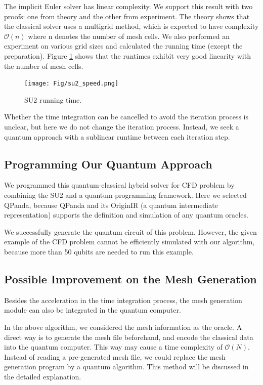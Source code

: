 \documentclass[%
 reprint,
 amsmath,amssymb,
pra,
]{revtex4-1}
\begin{document}
The implicit Euler solver has linear complexity. We support this result with two proofs: one from theory and the other from experiment. The theory\cite{MultigridBook} shows that the classical solver uses a multigrid method, which is expected to have complexity $\mathcal{O}(n)$ where n denotes the number of mesh cells. We also performed an experiment on various grid sizes and calculated the running time (except the preparation). Figure \ref{su2Speed} shows that the runtimes exhibit very good linearity with the number of mesh cells.

\begin{figure} 
\centering
\texttt{[image: Fig/su2\_speed.png]}
\caption{SU2 running time.} \label{su2Speed}
\end{figure}

Whether the time integration can be cancelled to avoid the iteration process is unclear, but here we do not change the iteration process. Instead, we seek a quantum approach with a sublinear runtime between each iteration step.

\subsection{Programming Our Quantum Approach}
We programmed this quantum-classical hybrid solver for CFD problem by combining the SU2 and a quantum programming framework. Here we selected QPanda, because QPanda and its OriginIR (a quantum intermediate representation) supports the definition and simulation of any quantum oracles.

We successfully generate the quantum circuit of this problem. However, the given example of the CFD problem cannot be efficiently simulated with our algorithm, because more than 50 qubits are needed to run this example. 

\subsection{Possible Improvement on the Mesh Generation}
Besides the acceleration in the time integration process, the mesh generation module can also be integrated in the quantum computer.

In the above algorithm, we considered the mesh information as the oracle. A direct way is to generate the mesh file beforehand, and encode the classical data into the quantum computer. This way may cause a time complexity of $\mathcal{O}(N)$. Instead of reading a pre-generated mesh file, we could replace the mesh generation program by a quantum algorithm. This method will be discussed in the detailed explanation.
\end{document}
